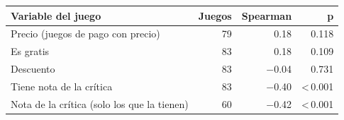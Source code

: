 \begin{tabular}{lrrr}
\toprule
Variable del juego & Juegos & Spearman & p \\
\midrule
Precio (juegos de pago con precio) & 79 & 0.18 & 0.118 \\
Es gratis & 83 & 0.18 & 0.109 \\
Descuento & 83 & −0.04 & 0.731 \\
Tiene nota de la crítica & 83 & −0.40 & <\,0.001 \\
Nota de la crítica (solo los que la tienen) & 60 & −0.42 & <\,0.001 \\
\bottomrule
\end{tabular}
